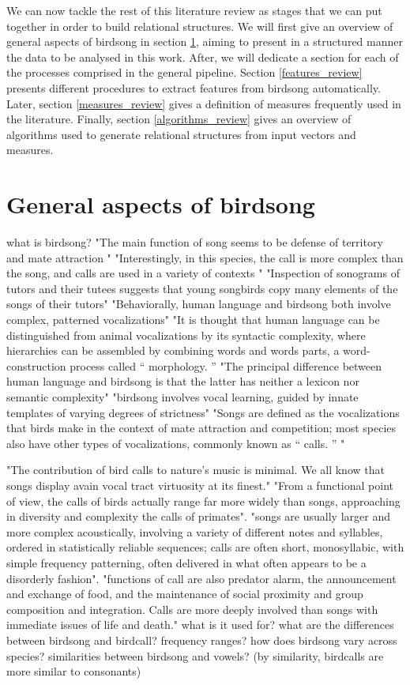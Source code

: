 \documentclass[../main.tex]{subfiles}
\begin{document}
\par We can now tackle the rest of this literature review as stages that we can put together in order to build relational structures. We will first give an overview of general aspects of birdsong in section \ref{birdsong_review}, aiming to present in a structured manner the data to be analysed in this work. After, we will dedicate a section for each of the processes comprised in the general pipeline. Section \ref{features_review} presents different procedures to extract features from birdsong automatically. Later, section \ref{measures_review} gives a definition of measures frequently used in the literature. Finally, section \ref{algorithms_review} gives an overview of algorithms used to generate relational structures from input vectors and measures.

\section{General aspects of birdsong} \label{birdsong_review}
what is birdsong?
\cite{Berwick2013}
"The main function of song seems to be defense of territory and mate attraction "
"Interestingly, in this species, the call is more complex than the song, and calls are used in a variety of contexts "
"Inspection of sonograms of tutors and their tutees suggests that young songbirds copy many elements of the songs of their tutors"
"Behaviorally, human language and birdsong both involve complex, patterned vocalizations"
"It is thought that human language can be distinguished from animal vocalizations by its syntactic complexity, where hierarchies can be assembled by combining words and words parts, a word-construction process called  “ morphology. ”
"The principal difference between human language and birdsong is that the latter has neither a lexicon nor semantic complexity"
"birdsong involves vocal learning, guided by innate templates of varying degrees of strictness"
"Songs are defined as the vocalizations that birds make in the context of mate attraction and competition; most species also have other types of vocalizations, commonly known as  “ calls. ” "

\cite{Marler2004}
"The contribution of bird calls to nature's music is minimal. We all know that songs display avain vocal tract virtuosity at its finest."
"From a functional point of view, the calls of birds actually range far more widely than songs, approaching in diversity and complexity the calls of primates".
"songs are usually larger and more complex acoustically, involving a variety of different notes and syllables, ordered in statistically reliable sequences; calls are often short, monosyllabic, with simple frequency patterning, often delivered in what often appears to be a disorderly fashion".
"functions of call are also predator alarm, the announcement and exchange of food, and the maintenance of social proximity and group composition and integration. Calls are more deeply involved than songs with immediate issues of life and death."
what is it used for?
what are the differences between birdsong and birdcall?
frequency ranges?
how does birdsong vary across species?
similarities between birdsong and vowels? (by similarity, birdcalls are more similar to consonants)
\end{document}

